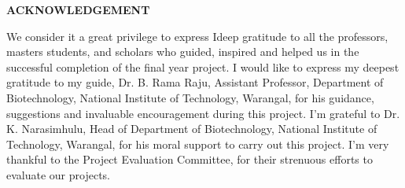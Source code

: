 \begin{center}
    \textbf{\Large ACKNOWLEDGEMENT}
\end{center}

\vspace{1in}

We consider it a great privilege to express Ideep gratitude to all the professors, masters students, and scholars who guided, 
inspired and helped us in the successful completion of the final year project.
I would like to express my deepest gratitude to my guide, 
Dr. B. Rama Raju, 
Assistant Professor, 
Department of Biotechnology, 
National Institute of Technology, 
Warangal, 
for his
guidance, 
suggestions and invaluable encouragement during this project.
I'm grateful to Dr. K. Narasimhulu, 
Head of Department of Biotechnology, 
National
Institute of Technology, 
Warangal, 
for his moral support to carry out this project.
I'm very thankful to the Project Evaluation Committee, 
for their strenuous efforts to
evaluate our projects. 

\vspace{1.5in}


\newpage
